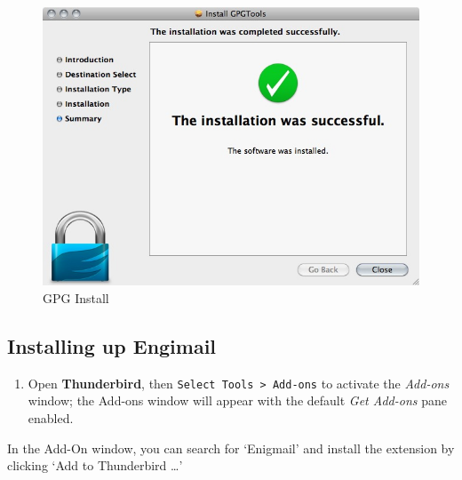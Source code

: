 \begin{figure}[htbp]
\centering
\includegraphics{gpg_mac_inst_8.jpg}
\caption{GPG Install}
\end{figure}

\subsection{Installing up Engimail}

\begin{enumerate}[1.]
\item
  Open \textbf{Thunderbird}, then \verb!Select Tools > Add-ons! to
  activate the \emph{Add-ons} window; the Add-ons window will appear
  with the default \emph{Get Add-ons} pane enabled.
\end{enumerate}
In the Add-On window, you can search for `Enigmail' and install the
extension by clicking `Add to Thunderbird \ldots{}'

